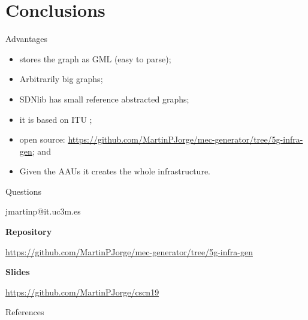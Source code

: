 \documentclass{beamer}
\begin{document}
\section{Conclusions}
\begin{frame}{Advantages}
    \begin{itemize}
        \item stores the graph as GML (easy to parse);
        \item Arbitrarily big graphs;
        \item SDNlib has small reference abstracted graphs;
        \item it is based on ITU \cite{itu};
        \item open source: \url{https://github.com/MartinPJorge/mec-generator/tree/5g-infra-gen}; and
        \item Given the AAUs it creates the whole infrastructure.
    \end{itemize}
\end{frame}

\begin{frame}{Questions}
    \begin{center}
        jmartinp@it.uc3m.es

        \vfill
        \textbf{Repository}

        \url{https://github.com/MartinPJorge/mec-generator/tree/5g-infra-gen}

        \vfill
        \textbf{Slides}

        \url{https://github.com/MartinPJorge/cscn19}
    \end{center}
\end{frame}


\begin{frame}{References}
    
    
\end{frame}
\end{document}

